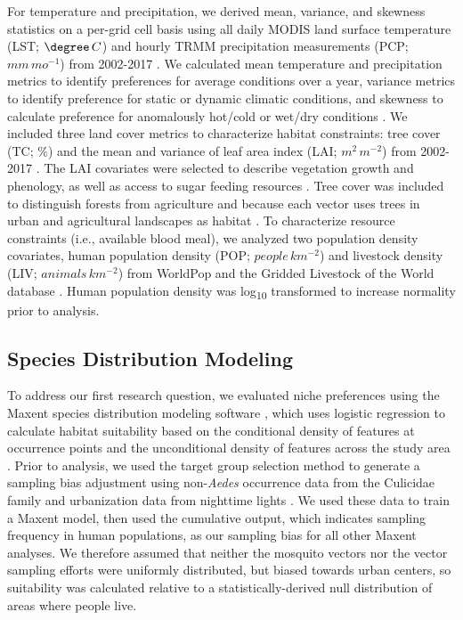 For temperature and precipitation, we derived mean, variance, and skewness statistics on a per-grid cell basis using all daily MODIS land surface temperature (LST; $\degree\, C$) and hourly TRMM precipitation measurements (PCP; $mm\, mo^{-1}$) from 2002-2017 \cite{Justice1998-pu, Huffman2007-iu, Hou2013-cn}. We calculated mean temperature and precipitation metrics to identify preferences for average conditions over a year, variance metrics to identify preference for static or dynamic climatic conditions, and skewness to calculate preference for anomalously hot/cold or wet/dry conditions \cite{Huffman2007-iu, Hou2013-cn}. We included three land cover metrics to characterize habitat constraints: tree cover (TC; $\%$) and the mean and variance of leaf area index (LAI; $m^{2}\, m^{-2}$) from 2002-2017 \cite{Justice1998-pu, Hansen2013-oz}. The LAI covariates were selected to describe vegetation growth and phenology, as well as access to sugar feeding resources \cite{Martinez-Ibarra1997-ra, Chen2015-dw}. Tree cover was included to distinguish forests from agriculture and because each vector uses trees in urban and agricultural landscapes as habitat \cite{Troyo2009-yv, Landau2012-dn}. To characterize resource constraints (i.e., available blood meal), we analyzed two population density covariates, human population density (POP; $people\, km^{-2}$) and livestock density (LIV; $animals\, km^{-2}$) from WorldPop and the Gridded Livestock of the World database \cite{Tatem2017-ma, Gilbert2018-bm}. Human population density was log\textsubscript{10} transformed to increase normality prior to analysis.

\subsection{Species Distribution Modeling}

To address our first research question, we evaluated niche preferences using the Maxent species distribution modeling software \cite{Phillips2006-ua, Steven_J_Phillips_Miroslav_Dudik_Robert_E_Schapire_undated-nv}, which uses logistic regression to calculate habitat suitability based on the conditional density of features at occurrence points and the unconditional density of features across the study area \cite{Elith2011-kb}. Prior to analysis, we used the target group selection method \cite{Phillips2009-nf, Merow2013-mw} to generate a sampling bias adjustment using non-\textit{Aedes} occurrence data from the Culicidae family and urbanization data from nighttime lights \cite{Mills2013-yb}. We used these data to train a Maxent model, then used the cumulative output, which indicates sampling frequency in human populations, as our sampling bias for all other Maxent analyses. We therefore assumed that neither the mosquito vectors nor the vector sampling efforts were uniformly distributed, but biased towards urban centers, so suitability was calculated relative to a statistically-derived null distribution of areas where people live.

